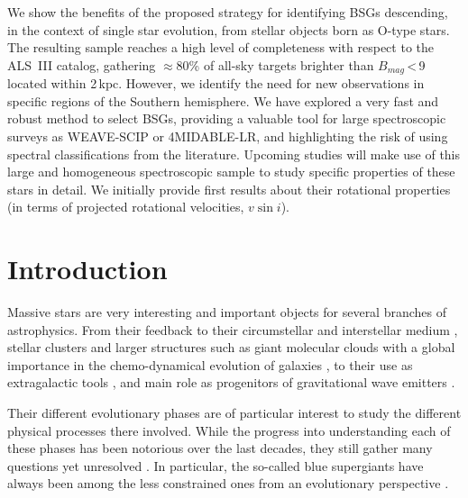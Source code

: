 \documentclass{aa}
\newcommand{\vsini}{\mbox{$v\sin i$}}
\begin{document}
{We show the benefits of the proposed strategy for identifying BSGs descending, in the context of single star evolution, from stellar objects born as O-type stars. The resulting sample reaches a high level of completeness with respect to the ALS~III catalog, gathering $\approx$80\% of all-sky targets brighter than $B_{mag}$\,<\,9 located within 2\,kpc. However, we identify the need for new observations in specific regions of the Southern hemisphere.
}
{We have explored a very fast and robust method to select BSGs, providing a valuable tool for large spectroscopic surveys as WEAVE-SCIP or 4MIDABLE-LR, and highlighting the risk of using spectral classifications from the literature. Upcoming studies will make use of this large and homogeneous spectroscopic sample to study specific properties of these stars in detail. We initially provide first results about their rotational properties (in terms of projected rotational velocities, \vsini). 
}
%
%
\maketitle


\section{Introduction}
\label{section:1_intro}

Massive stars are very interesting and important objects for several branches of astrophysics. From their feedback to their circumstellar and interstellar medium \citep{1996A&A...305..229G,2013A&A...550A..49K}, stellar clusters \citep{2013MNRAS.431.1337R} and larger structures such as giant molecular clouds \citep{2002ApJ...566..302M} with a global importance in the chemo-dynamical evolution of galaxies \citep{2008IAUS..250..391M}, to their use as extragalactic tools \citep{2000ARA&A..38..613K,2003LNP...635..123K,2003ApJ...582L..83K,2008ApJ...681..269K}, and main role as progenitors of gravitational wave emitters \citep{2016Natur.534..512B,2016A&A...588A..50M}. 

Their different evolutionary phases are of particular interest to study the different physical processes there involved. While the progress into understanding each of these phases has been notorious over the last decades, they still gather many questions yet unresolved \citep{2012ARA&A..50..107L}. In particular, the so-called blue supergiants have always been among the less constrained ones from an evolutionary perspective \citep[e.g.][and many others]{1990ApJ...363..119F,1992A&AS...94..569L,1993A&AS...97..559L,2000A&A...361..101M}. 
\end{document}

